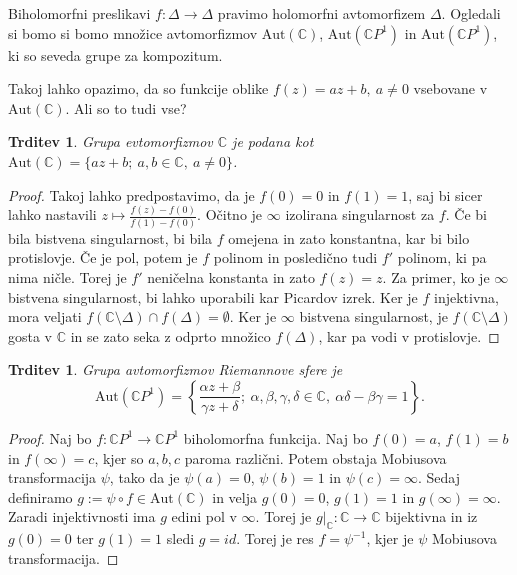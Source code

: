 \documentclass[10pt, a4paper]{article}
\newtheorem{trditev}[izr]{Trditev}
\newenvironment{noticeC}{%
  \tcolorbox[%
  notitle,
  empty,
  enhanced,  %
  breakable,
  coltext=black, 
  fontupper=\rmfamily,
  parbox=false,
  noparskip,
  sharp corners,
  boxrule=-1pt,  %
  frame hidden,
  left=7pt,  %
  right=7pt,
  top=5pt,
  bottom=5pt,
  before skip=2.5ex plus 2pt,
  after skip=2.5ex plus 2pt,
  overlay unbroken and last={%
  },
  ]}
{\endtcolorbox}
\newenvironment{dokaz}%
  {\begin{noticeC}\begin{proof}}%
  {\end{proof}\end{noticeC}}
\newcommand{\C}{\mathbb {C}}
\begin{document}
Biholomorfni preslikavi $f: \Delta \to \Delta$ pravimo holomorfni avtomorfizem $\Delta$.
Ogledali si bomo si bomo množice avtomorfizmov $\mathrm{Aut}(\C)$, $\mathrm{Aut}(\C P^1)$ in $\mathrm{Aut} (\C P^{1})$,
ki so seveda grupe za kompozitum. 

Takoj lahko opazimo, da so funkcije oblike $f(z) = az + b,\ a\neq 0$ vsebovane v 
$\mathrm{Aut}(\C)$. Ali so to tudi vse?

\begin{trditev}
  Grupa evtomorfizmov $\C$ je podana kot $\mathrm{Aut} (\C) = \{az + b ;\ a, b \in \C,\ a \neq 0\}$.
\end{trditev}

\begin{dokaz}
  Takoj lahko predpostavimo, da je $f(0) = 0$ in $f(1) = 1$,
  saj bi sicer lahko nastavili $z \mapsto \frac{f(z) - f(0)}{f(1) - f(0)}$.
  Očitno je $\infty$ izolirana singularnost za $f$. Če bi bila bistvena singularnost,
  bi bila $f$ omejena in zato konstantna, kar bi bilo protislovje.
  Če je pol, potem je $f$ polinom in posledično tudi $f'$ polinom, ki pa nima ničle.
  Torej je $f'$ neničelna konstanta in zato $f(z) = z.$
  Za primer, ko je $\infty$ bistvena singularnost, bi lahko uporabili kar Picardov izrek.
  Ker je $f$ injektivna, mora veljati $f(\C \setminus \Delta) \cap f(\Delta) = \emptyset$.
  Ker je $\infty$ bistvena singularnost, je $f(\C \setminus \Delta)$ gosta v $\C$ in se zato seka 
  z odprto množico $f(\Delta)$, kar pa vodi v protislovje.
\end{dokaz}

\begin{trditev}
  Grupa avtomorfizmov Riemannove sfere je 
  $$\mathrm{Aut} (\C P^1) = \left\lbrace \frac{\alpha z + \beta}{\gamma z + \delta};\ \alpha,\beta, \gamma,\delta \in \C,\ \alpha \delta - \beta \gamma = 1 \right\rbrace.$$
\end{trditev}

\begin{dokaz}
  Naj bo $f: \C P^1 \to \C P^1$ biholomorfna funkcija.
  Naj bo $f(0) = a$, $f(1) = b$ in $f(\infty) = c$, kjer so $a, b, c$ paroma različni.
  Potem obstaja Mobiusova transformacija $\psi$, tako da je $\psi (a) = 0$, $\psi (b) = 1$ in $\psi (c) = \infty$.
  Sedaj definiramo $g := \psi \circ f \in \mathrm{Aut} (\C)$ in velja 
  $g(0) = 0$, $g(1) = 1$ in $g(\infty) = \infty$.
  Zaradi injektivnosti ima $g$ edini pol v $\infty$.
  Torej je $g \big| _{\C}: \C \to \C$ bijektivna in iz $g(0) = 0$ ter $g(1) = 1$ sledi $g = id$.
  Torej je res $f = \psi^{-1}$, kjer je $\psi$ Mobiusova transformacija. 
\end{dokaz}
\end{document}
